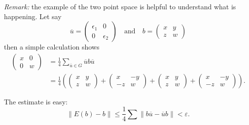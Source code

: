 \textit{Remark:} the example of the two point space is helpful to understand what is happening. Let say 
\[ \overline u =  \begin{pmatrix} \epsilon_1 &  0 \\ 0 & \epsilon_2\end{pmatrix} \quad \text{and} \quad b=  \begin{pmatrix} x &  y \\ z & w \end{pmatrix}\]
then a simple calculation shows 
\[ \begin{split} \begin{pmatrix} x &  0 \\ 0 & w \end{pmatrix} 
		& = \frac{1}{4}\sum_{\overline u \in G} \overline u b \overline u \\
   		& = \frac{1}{4} \left( 
 \begin{pmatrix} x &  y \\ z & w \end{pmatrix}+ \begin{pmatrix} x &  -y \\ -z & w \end{pmatrix}+  \begin{pmatrix} x &  y \\ z & w \end{pmatrix}+ \begin{pmatrix} x & - y \\ -z & w \end{pmatrix}
\right).
\end{split}\]

The estimate is easy: 
\[ \| E(b)-b \|   \leq \frac{1}{4} \sum \|  b \overline u - \overline u b\| < \varepsilon.\]

